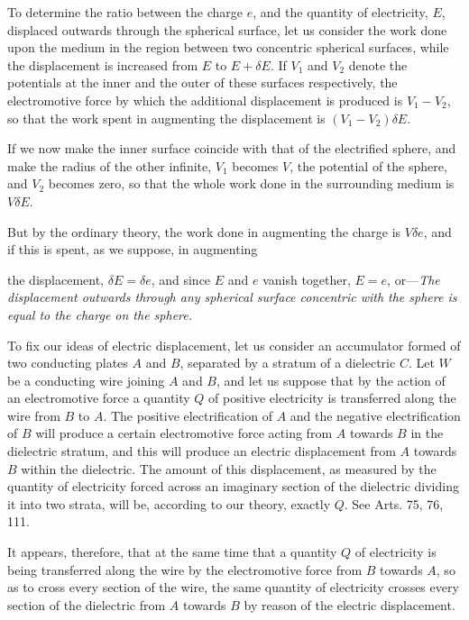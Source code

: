 \documentclass[11pt,a4paper]{article}
\begin{document}
To determine the ratio between the charge \(e\), and the quantity of
electricity, \(E\), displaced outwards through the spherical surface, let
us consider the work done upon the medium in the region between two
concentric spherical surfaces, while the displacement is increased from
\(E\) to \(E+\delta E\). If \(V_1\) and \(V_2\) denote the potentials at
the inner and the outer of these surfaces respectively, the electromotive
force by which the additional displacement is produced is \(V_1-V_2\),
so that the work spent in augmenting the displacement is
\((V_1-V_2)\delta E\).

If we now make the inner surface coincide with that of the electrified
sphere, and make the radius of the other infinite, \(V_1\) becomes
\(V\), the potential of the sphere, and \(V_2\) becomes zero, so that the
whole work done in the surrounding medium is \(V\delta E\).

But by the ordinary theory, the work done in augmenting the charge
is \(V\delta e\), and if this is spent, as we suppose, in augmenting

\clearpage
\setcounter{footnote}{0}

the displacement, \(\delta E=\delta e\), and since \(E\) and \(e\) vanish
together, \(E=e\), or---\textit{The displacement outwards through any
spherical surface concentric with the sphere is equal to the charge on
the sphere.}

To fix our ideas of electric displacement, let us consider an accumulator
formed of two conducting plates \(A\) and \(B\), separated by a stratum
of a dielectric \(C\). Let \(W\) be a conducting wire joining \(A\) and
\(B\), and let us suppose that by the action of an electromotive force
a quantity \(Q\) of positive electricity is transferred along the wire
from \(B\) to \(A\). The positive electrification of \(A\) and the negative
electrification of \(B\) will produce a certain electromotive force
acting from \(A\) towards \(B\) in the dielectric stratum, and this will
produce an electric displacement from \(A\) towards \(B\) within the
dielectric. The amount of this displacement, as measured by the
quantity of electricity forced across an imaginary section of the
dielectric dividing it into two strata, will be, according to our theory,
exactly \(Q\). See Arts. 75, 76, 111.

It appears, therefore, that at the same time that a quantity \(Q\) of
electricity is being transferred along the wire by the electromotive
force from \(B\) towards \(A\), so as to cross every section of the wire,
the same quantity of electricity crosses every section of the dielectric
from \(A\) towards \(B\) by reason of the electric displacement.
\end{document}
